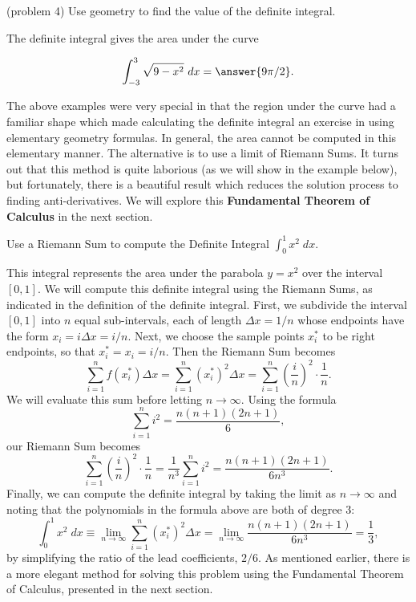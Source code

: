 \documentclass[handout]{ximera}
\begin{document}
\begin{problem}(problem 4)
Use geometry to find the value of the definite integral.
\begin{hint}
The definite integral gives the area under the curve
\end{hint}
\[\int_{-3}^{3} \sqrt{9-x^2} \ dx = \answer{9\pi/2}.\]
\end{problem}


The above examples were very special in that the region under the curve had a familiar shape which
made calculating the definite integral an exercise in using elementary geometry formulas. 
In general, the area cannot be computed in this elementary manner.  
The alternative is to use a limit of Riemann Sums.  It turns out that this method is quite laborious (as we will show in the example below), but 
fortunately, there is a beautiful result which reduces the solution process to finding anti-derivatives. 
We will explore this \textbf{Fundamental Theorem of Calculus} in the next section.

\begin{example}[example 5]
Use a Riemann Sum to compute the Definite Integral $\displaystyle{\int_0^1 x^2 \; dx}$.

This integral represents the area under the parabola $y = x^2$ over the interval $[0,1]$. 
We will compute this definite integral using the Riemann Sums, as indicated in the definition of the definite integral.
First, we subdivide the interval $[0,1]$ into $n$ equal sub-intervals, each of length 
$\Delta x= 1/n$ whose endpoints have the form $x_i = i\Delta x = i/n$.  Next, we choose the sample points $x_i^*$
to be right endpoints, so that $x_i^* = x_i = i/n$. Then the Riemann Sum becomes
\[
\sum_{i = 1}^n f(x_i^*) \Delta x =  \sum_{i = 1}^n \left(x_i^*\right)^2 \Delta x = \sum_{i = 1}^n \left(\frac{i}{n}\right)^2 \cdot \frac{1}{n}.
\]
We will evaluate this sum before letting $n\to \infty$. Using the formula
\[
\sum_{i = 1}^n i^2 = \frac{n(n+1)(2n+1)}{6},
\]
our Riemann Sum becomes
\[
\sum_{i = 1}^n \left(\frac{i}{n}\right)^2 \cdot \frac{1}{n} = \frac{1}{n^3} \sum_{i = 1}^n i^2 = \frac{n(n+1)(2n+1)}{6n^3}.
\]
Finally, we can compute the definite integral by taking the limit as $n \to \infty$ and noting that the polynomials in the formula above are both of degree 3:
\[
\int_0^1 x^2 \; dx \equiv \lim_{n \to \infty} \sum_{i = 1}^n \left(x_i^*\right)^2 \Delta x = \lim_{n \to \infty} \frac{n(n+1)(2n+1)}{6n^3} = \frac{1}{3},
\]
by simplifying the ratio of the lead coefficients, $2/6$.
As mentioned earlier, there is a more elegant method for solving this problem using the Fundamental Theorem of Calculus, presented in the next section.

\end{example}
\end{document}
